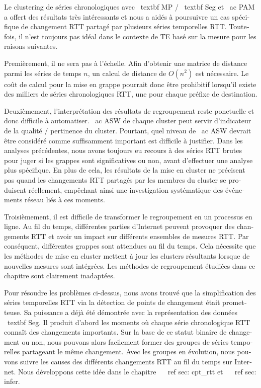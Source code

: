 \begin{otherlanguage}{french}
Le clustering de séries chronologiques avec \ textbf {MP} / \ textbf {Seg} et \ ac {PAM} a offert des résultats très intéressants et nous a aidés à poursuivre un cas spécifique de changement RTT partagé par plusieurs séries temporelles RTT.
Toutefois, il n'est toujours pas idéal dans le contexte de TE basé sur la mesure pour les raisons suivantes.

Premièrement, il ne sera pas à l'échelle. Afin d'obtenir une matrice de distance parmi les séries de temps $ n $, un calcul de distance de $ O (n ^ 2) $ est nécessaire. Le coût de calcul pour la mise en grappe pourrait donc être prohibitif lorsqu'il existe des milliers de séries chronologiques RTT, une pour chaque préfixe de destination.

Deuxièmement, l'interprétation des résultats de regroupement reste ponctuelle et donc difficile à automatiser.
\ ac {ASW} de chaque cluster peut servir d'indicateur de la qualité / pertinence du cluster.
Pourtant, quel niveau de \ ac {ASW} devrait être considéré comme suffisamment important est difficile à justifier.
Dans les analyses précédentes, nous avons toujours eu recours à des séries RTT brutes pour juger si les grappes sont significatives ou non, avant d'effectuer une analyse plus spécifique.
En plus de cela, les résultats de la mise en cluster ne précisent pas quand les changements RTT partagés par les membres du cluster se produisent réellement, empêchant ainsi une investigation systématique des événements réseau liés à ces moments.

Troisièmement, il est difficile de transformer le regroupement en un processus en ligne.
Au fil du temps, différentes parties d'Internet peuvent provoquer des changements RTT et avoir un impact sur différents ensembles de mesures RTT.
Par conséquent, différentes grappes sont attendues au fil du temps.
Cela nécessite que les méthodes de mise en cluster mettent à jour les clusters résultants lorsque de nouvelles mesures sont intégrées.
Les méthodes de regroupement étudiées dans ce chapitre sont clairement inadaptées.

Pour résoudre les problèmes ci-dessus, nous avons trouvé que la simplification des séries temporelles RTT via la détection de points de changement était prometteuse.
Sa puissance a déjà été démontrée avec la représentation des données \ textbf {Seg}.
Il produit d'abord les moments où chaque série chronologique RTT connaît des changements importants.
Sur la base de ce statut binaire de changement ou non, nous pouvons alors facilement former des groupes de séries temporelles partageant le même changement.
Avec les groupes en évolution, nous pouvons suivre les causes des différents changements RTT au fil du temps sur Internet.
Nous développons cette idée dans le chapitre ~ \ ref {sec: cpt_rtt} et ~ \ ref {sec: infer}.


\end{otherlanguage}
